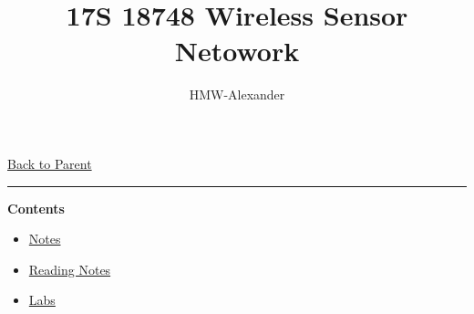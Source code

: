 \documentclass[letterpaper,11pt]{article}
\title{\textbf{17S 18748 Wireless Sensor Netowork}}
\author{HMW-Alexander}
\newcommand{\panhline}{\begin{center}\rule{\textwidth}{1pt}\end{center}}
\begin{document}
\maketitle
\href{../index.html}{Back to Parent}

\panhline
\textbf{Contents}

\begin{itemize}
	\item \href{./Notes/index.html}{Notes}
	\item \href{./ReadingNotes/index.html}{Reading Notes}
	\item \href{./Labs/index.html}{Labs}
\end{itemize}
\end{document}
